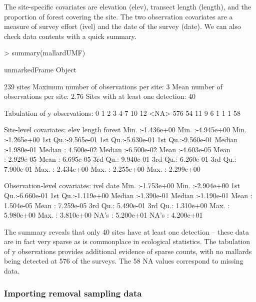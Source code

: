 \documentclass[article,shortnames]{jss}
\begin{document}
The site-specific covariates are elevation (elev), transect length (length), and the proportion of forest covering the site. The two observation covariates are a measure of survey effort (ivel) and the date of the survey (date). We can also check data contents with a quick summary.

\begin{Schunk}
\begin{Sinput}
> summary(mallardUMF)
\end{Sinput}
\begin{Soutput}
unmarkedFrame Object

239 sites
Maximum number of observations per site: 3 
Mean number of observations per site: 2.76 
Sites with at least one detection: 40 

Tabulation of y observations:
   0    1    2    3    4    7   10   12 <NA> 
 576   54   11    9    6    1    1    1   58 

Site-level covariates:
      elev                length               forest          
 Min.   :-1.436e+00   Min.   :-4.945e+00   Min.   :-1.265e+00  
 1st Qu.:-9.565e-01   1st Qu.:-5.630e-01   1st Qu.:-9.560e-01  
 Median :-1.980e-01   Median : 4.500e-02   Median :-6.500e-02  
 Mean   :-4.603e-05   Mean   :-2.929e-05   Mean   : 6.695e-05  
 3rd Qu.: 9.940e-01   3rd Qu.: 6.260e-01   3rd Qu.: 7.900e-01  
 Max.   : 2.434e+00   Max.   : 2.255e+00   Max.   : 2.299e+00  

Observation-level covariates:
      ivel                 date           
 Min.   :-1.753e+00   Min.   :-2.904e+00  
 1st Qu.:-6.660e-01   1st Qu.:-1.119e+00  
 Median :-1.390e-01   Median :-1.190e-01  
 Mean   : 1.504e-05   Mean   : 7.259e-05  
 3rd Qu.: 5.490e-01   3rd Qu.: 1.310e+00  
 Max.   : 5.980e+00   Max.   : 3.810e+00  
 NA's   : 5.200e+01   NA's   : 4.200e+01  
\end{Soutput}
\end{Schunk}

The summary reveals that only 40 sites have at least one detection -- these data are in fact very sparse as is commonplace in ecological statistics. The tabulation of y observations provides additional evidence of sparse counts, with no mallards being detected at 576 of the surveys. The 58 NA values correspond to missing data. 


\subsubsection{Importing removal sampling data}
\end{document}
